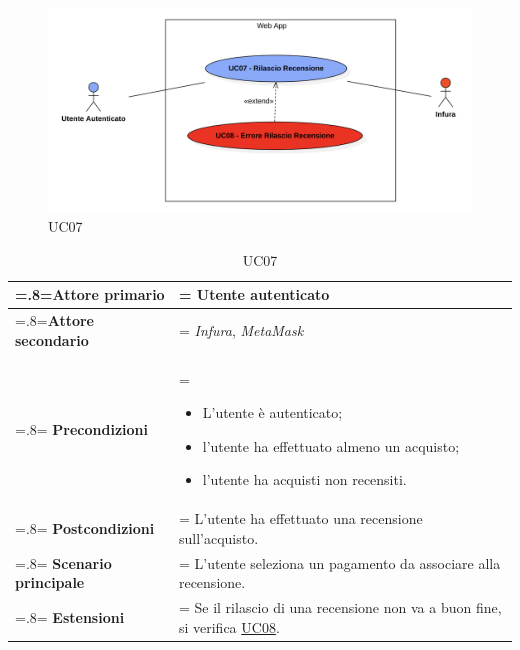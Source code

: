             \begin{figure}[H]
                \centering
                \includegraphics[scale=0.6]{src/img/UC07.png}
                \caption{UC07}
            \end{figure}

            \begin{table}[H]
                \centering
                \renewcommand{\arraystretch}{1.8}
                \renewcommand\tabularxcolumn[1]{m{#1}}
                \begin{tabularx}{0.9\textwidth}{
                    >{\hsize=.8\hsize\linewidth=\hsize}X
                    >{\hsize=1.2\hsize\linewidth=\hsize}X}
                    \hline
                    \textbf{Attore primario} & Utente autenticato \\
                    \hline
                    \textbf{Attore secondario} & \textit{Infura}, \textit{MetaMask} \\
                    \hline
                    \textbf{Precondizioni} &
                        \begin{itemize}
                            \item L'utente è autenticato;
                            \item l'utente ha effettuato almeno un acquisto;
                            \item l'utente ha acquisti non recensiti.
                        \end{itemize} \\
                    \hline
                    \textbf{Postcondizioni} & L'utente ha effettuato una recensione sull'acquisto. \\
                    \hline
                    \textbf{Scenario principale} &
                    L'utente seleziona un pagamento da associare alla recensione.\\
                    \hline
                    \textbf{Estensioni} & Se il rilascio di una recensione non va a buon fine, si verifica \hyperref[UC08]{UC08}. \\
                    \hline
                \end{tabularx}
                \caption{UC07}
            \end{table}

